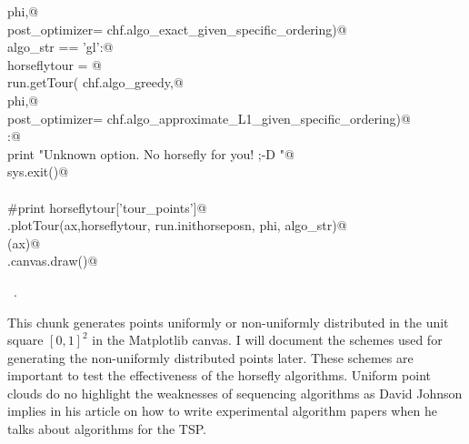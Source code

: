 \documentclass[12pt]{report}
\begin{document}
\begin{flushleft}
\begin{list}{}{}
\mbox{}\verb@                          phi,@\\
\mbox{}\verb@                          post_optimizer= chf.algo_exact_given_specific_ordering)@\\
\mbox{}\verb@elif algo_str == 'gl':@\\
\mbox{}\verb@      horseflytour = @\\
\mbox{}\verb@             run.getTour( chf.algo_greedy,@\\
\mbox{}\verb@                          phi,@\\
\mbox{}\verb@                          post_optimizer= chf.algo_approximate_L1_given_specific_ordering)@\\
\mbox{}\verb@else:@\\
\mbox{}\verb@      print "Unknown option. No horsefly for you! ;-D "@\\
\mbox{}\verb@      sys.exit()@\\
\mbox{}\verb@@\\
\mbox{}\verb@#print horseflytour['tour_points']@\\
\mbox{}\verb@chf.plotTour(ax,horseflytour, run.inithorseposn, phi, algo_str)@\\
\mbox{}\verb@applyAxCorrection(ax)@\\
\mbox{}\verb@fig.canvas.draw()@\\
\mbox{}\verb@@{\NWsep}
\end{list}
\vspace{-1.5ex}
\footnotesize
\begin{list}{}{\setlength{\itemsep}{-\parsep}\setlength{\itemindent}{-\leftmargin}}
\item \NWtxtMacroRefIn\ .

\item{}
\end{list}
\vspace{4ex}
\end{flushleft}
\newchunk This chunk generates points uniformly or non-uniformly distributed in the 
unit square $[0,1]^2$ in the Matplotlib canvas. I will document the schemes used for generating the non-uniformly
distributed points later. These schemes are important to test the effectiveness of 
the horsefly algorithms. Uniform point clouds do no highlight the weaknesses of 
sequencing algorithms as David Johnson implies in his article on how to write 
experimental algorithm papers when he talks about algorithms for the TSP. 
\end{document}
